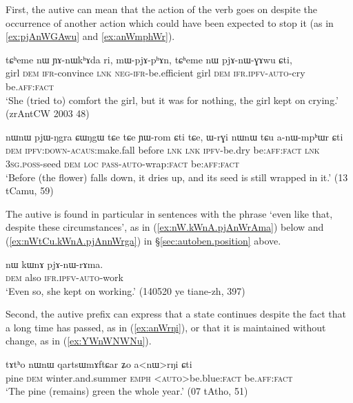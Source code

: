 First, the autive can mean that the action of the verb goes on despite the occurrence of another action which could have been expected to stop it (as in \ref{ex:pjAnWGAwu} and \ref{ex:anWmphWr}).  

\begin{exe}
\ex \label{ex:pjAnWGAwu}
\gll tɕʰeme nɯ ɲɤ-nɯkʰɤda ri, mɯ-pjɤ-pʰɤn, tɕʰeme nɯ pjɤ-nɯ-ɣɤwu ɕti, \\
girl \textsc{dem} \textsc{ifr}-convince \textsc{lnk} \textsc{neg}-\textsc{ifr}-be.efficient girl \textsc{dem} \textsc{ifr}.\textsc{ipfv}-\textsc{auto}-cry  be.\textsc{aff}:\textsc{fact} \\
\glt `She (tried to) comfort the girl, but it was for nothing, the girl kept on crying.' (zrAntCW 2003 48)
\end{exe} 

\begin{exe}
\ex \label{ex:anWmphWr}
\gll nɯnɯ pjɯ-ŋgra ɕɯŋgɯ tɕe tɕe ɲɯ-rom ɕti tɕe, ɯ-rɣi nɯnɯ tɕu a-nɯ-mpʰɯr ɕti \\
\textsc{dem} \textsc{ipfv}:\textsc{down}-\textsc{acaus}:make.fall before \textsc{lnk}  \textsc{lnk} \textsc{ipfv}-be.dry be:\textsc{aff}:\textsc{fact} \textsc{lnk} \textsc{3sg}.\textsc{poss}-seed \textsc{dem} \textsc{loc} \textsc{pass}-\textsc{auto}-wrap:\textsc{fact} be:\textsc{aff}:\textsc{fact} \\
\glt `Before (the flower) falls down, it dries up, and its seed is still wrapped in it.' (13 tCamu, 59)
\end{exe} 

The autive is found in particular in sentences with the phrase  `even like that, despite these circumstances', as in (\ref{ex:nW.kWnA.pjAnWrAma}) below and (\ref{ex:nWtCu.kWnA.pjAnnWrga}) in §\ref{sec:autoben.position} above.

\begin{exe}
\ex \label{ex:nW.kWnA.pjAnWrAma}
\gll  nɯ kɯnɤ pjɤ-nɯ-rɤma. \\
 \textsc{dem} also \textsc{ifr}.\textsc{ipfv}-\textsc{auto}-work \\ 
\glt `Even so, she kept on working.' (140520 ye tiane-zh, 397)
\end{exe} 
 
Second, the autive  prefix can express that a state continues despite the fact that a long time has passed, as in (\ref{ex:anWrŋi}), or that it is maintained without change, as in (\ref{ex:YWnWNWNu}).

\begin{exe}
\ex \label{ex:anWrŋi}
\gll tɤtʰo nɯnɯ qartsɯmɤftɕar ʑo a<nɯ>rŋi ɕti \\
pine \textsc{dem} winter.and.summer \textsc{emph} <\textsc{auto}>be.blue:\textsc{fact} be.\textsc{aff}:\textsc{fact} \\
\glt `The pine (remains) green the whole year.' (07 tAtho, 51)
\end{exe}
 

